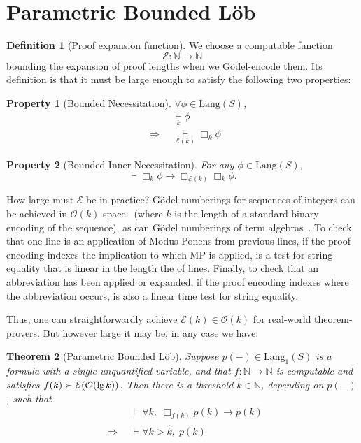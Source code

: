 \documentclass[onecolumn]{miri-tech-article}
\newtheorem{theorem}{Theorem}
\newtheorem{property}{Property}
\numberwithin{equation}{section}
\theoremstyle{definition}
\newtheorem{definition}[theorem]{Definition}
\newcommand{\NN}{\mathbb{N}}
\newcommand{\Ee}{\mathcal{E}}
\newcommand{\Oo}{\mathcal{O}}
\newcommand{\proves}[1]{\underset{#1}{\vdash}}
\newcommand{\bx}[1]{\Box_{#1}}
\newcommand{\Lang}{\mathrm{Lang}}
\renewcommand{\implies}{\rightarrow}
\renewcommand{\to}{\rightarrow}
\newcommand{\Implies}{\;\;\Rightarrow\;\;}
\renewcommand{\lg}{\mathrm{lg\hspace{0.3ex}}}
\renewcommand{\-}{^{-1}}
\begin{document}
\section{Parametric Bounded L\"{o}b}\label{sec:blob}

\begin{definition}[Proof expansion function]\label{def:E}We choose a computable function $$\Ee:\NN\to\NN$$ bounding the expansion of proof lengths when we G\"{o}del-encode them.  Its definition is that it must be large enough to satisfy the following two properties:
\end{definition}

\begin{property}[Bounded Necessitation]
$\forall \phi \in \Lang(S)$,
\begin{align}
             &\proves{k} \phi \\
\Implies &\proves{\Ee (k)} \bx{k} \phi
\end{align}
\end{property}
\begin{property}[Bounded Inner Necessitation]
For any $\phi \in \Lang(S)$,
$$\proves{} \bx{k}\phi \implies \bx{\Ee (k)}\bx{k}\phi.$$
\end{property}

\noindent {\bf Achieving $\Ee(k)\in \Oo(k)$.}  How large must $\Ee$ be in practice?  G\"{o}del numberings for sequences of integers can be achieved in $\Oo(k)$ space~\cite{Tsai:2002} (where $k$ is the length of a standard binary encoding of the sequence), as can G\"{o}del numberings of term algebras~\cite{Tarau:2013}.  To check that one line is an application of Modus Ponens from previous lines, if the proof encoding indexes the implication to which MP is applied, is a test for string equality that is linear in the length the of lines.  Finally, to check that an abbreviation has been applied or expanded, if the proof encoding indexes where the abbreviation occurs, is also a linear time test for string equality.  

Thus, one can straightforwardly achieve $\Ee(k) \in \Oo(k)$ for real-world theorem-provers.  But however large it may be, in any case we have:

\begin{theorem}[Parametric Bounded L\"{o}b]\label{thm:pblob}
Suppose $p(-)\in\Lang_1(S)$ is a formula with a single unquantified variable, and that $f:\NN \to \NN$ is computable and satisfies $f(k) \succ \Ee(\Oo(\lg k))$.  Then there is a threshold $\hat k \in \NN$, depending on $p(-)$, such that
\begin{align*}
             &\proves{} \forall k,\; \bx{f(k)}p(k) \implies p(k)\\
\Implies &\proves{} \forall k>\hat k, \; p(k)
\end{align*}
\end{theorem}
\end{document}
